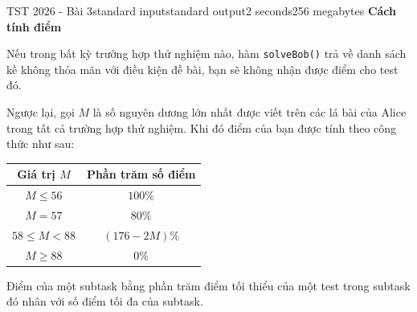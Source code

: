 \begin{problem}{TST 2026 - Bài 3}{standard input}{standard output}{2 seconds}{256 megabytes}
\textbf{Cách tính điểm}

Nếu trong bất kỳ trường hợp thử nghiệm nào, hàm \texttt{solveBob()} trả về danh sách kề không thỏa mãn với điều kiện đề bài, bạn sẽ không nhận được điểm cho test đó.

Ngược lại, gọi $M$ là số nguyên dương lớn nhất được viết trên các lá bài của Alice trong tất cả trường hợp thử nghiệm. Khi đó điểm của bạn được tính theo công thức như sau:

\begin{center}
  \begin{tabular}{|c|c|} \hline
    \textbf{Giá trị $M$} & \textbf{Phần trăm số điểm} \\ \hline
    $M\le 56$ & $100\%$ \\ \hline
    $M=57$ & $80\%$ \\ \hline
    $58\le M\lt 88$ & $(176-2M)\%$ \\ \hline
    $M\ge 88$ & $0\%$ \\ \hline
  \end{tabular}
\end{center}

Điểm của một subtask bằng phần trăm điểm tối thiểu của một test trong subtask đó nhân với số điểm tối đa của subtask.


\end{problem}

